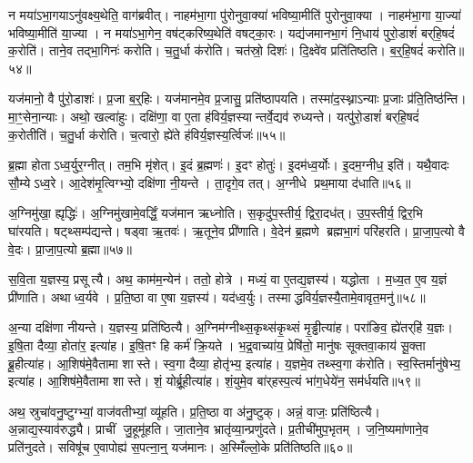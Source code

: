 न मया॑\-ऽभा॒गया\-ऽनु॑वक्ष्य॒थेति॒ वाग॑ब्रवीत्।
नाहम॑भा॒गा पु॑रोनुवा॒क्या॑ भविष्या॒मीति॑ पुरोनुवा॒क्या।
नाहम॑भा॒गा या॒ज्या॑ भविष्या॒मीति॑ या॒ज्या।
न मया॑\-ऽभा॒गेन॒ वष॑ट्करिष्य॒थेति॑ वषट्का॒रः।
यद्य॑जमानभा॒गं नि॒धाय॑ पुरो॒डाशं॑ बर्‌\mbox{}हि॒षदं॑ क॒रोति॑।
ताने॒व तद्भा॒गिनः॑ करोति।
च॒तु॒र्धा क॑रोति।
चत॑स्रो॒ दिशः॑।
दि॒क्ष्वे॑व प्रति॑तिष्ठति।
ब॒र्॒हि॒षदं॑ करोति॥५४॥

यज॑मानो॒ वै पु॑रो॒डाशः॑।
प्र॒जा ब॒र्॒हिः।
यज॑मानमे॒व प्र॒जासु॒ प्रति॑ष्ठापयति।
तस्मा॑द॒स्थ्ना\-ऽन्याः प्र॒जाः प्र॑ति॒तिष्ठ॑न्ति।
मा॒ꣳ॒सेना॒न्याः।
अथो॒ खल्वा॑हुः।
दक्षि॑णा॒ वा ए॒ता ह॑विर्य॒ज्ञस्यान्तर्वे॒द्यव॑ रुध्यन्ते।
यत्पु॑रो॒डाशं॑ बर्‌\mbox{}हि॒षदं॑ क॒रोतीति॑।
च॒तु॒र्धा क॑रोति।
च॒त्वारो॒ ह्ये॑ते ह॑विर्य॒ज्ञस्य॒र्त्विजः॑॥५५॥

ब्र॒ह्मा होता\-ऽध्व॒र्युर॒ग्नीत्।
तम॒भि मृ॑शेत्।
इ॒दं ब्र॒ह्मणः॑।
इ॒दꣳ होतुः॑।
इ॒दम॑ध्व॒र्योः।
इ॒दम॒ग्नीध॒ इति॑।
यथै॒वादः सौ॒म्ये\-ऽध्व॒रे।
आ॒देश॑मृ॒त्विग्भ्यो॒ दक्षि॑णा नी॒यन्ते।
ता॒दृगे॒व तत्।
अ॒ग्नीधे प्रथ॒माया द॑धाति॥५६॥

अ॒ग्निमु॑खा॒ ह्यृद्धिः॑।
अ॒ग्निमु॑खामे॒वर्द्धिं॒ यज॑मान ऋध्नोति।
स॒कृदु॑प॒स्तीर्य॒ द्विरा॒दध॑त्।
उ॒प॒स्तीर्य॒ द्विर॒भि घा॑रयति।
षट्थ्सम्प॑द्यन्ते।
षड्वा ऋ॒तवः॑।
ऋ॒तूने॒व प्री॑णाति।
वे॒देन॑ ब्र॒ह्मणे ब्रह्मभा॒गं परि॑हरति।
प्रा॒जा॒प॒त्यो वै वे॒दः।
प्रा॒जा॒प॒त्यो ब्र॒ह्मा॥५७॥

स॒वि॒ता य॒ज्ञस्य॒ प्रसूत्यै।
अथ॒ काम॑म॒न्येन॑।
ततो॒ होत्रे।
मध्यं॒ वा ए॒तद्य॒ज्ञस्य॑।
यद्धोता।
म॒ध्य॒त ए॒व य॒ज्ञं प्री॑णाति।
अथाध्व॒र्यवे।
प्र॒ति॒ष्ठा वा ए॒षा य॒ज्ञस्य॑।
यद॑ध्व॒र्युः।
तस्माद्धविर्य॒ज्ञस्यै॒तामे॒वावृत॒मनु॑॥५८॥

अ॒न्या दक्षि॑णा नीयन्ते।
य॒ज्ञस्य॒ प्रति॑ष्ठित्यै।
अ॒ग्निम॑ग्नीथ्स॒कृथ्स॑कृ॒थ्सं मृ॒ड्ढीत्या॑ह।
परा॑ङिव॒ ह्ये॑तर्‌\mbox{}हि॑ य॒ज्ञः।
इ॒षि॒ता दैव्या॒ होता॑र॒ इत्या॑ह।
इ॒षि॒तꣳ हि कर्म॑ क्रि॒यते।
भ॒द्र॒वाच्या॑य॒ प्रेषि॑तो॒ मानु॑षः सूक्तवा॒काय॑ सू॒क्ता ब्रू॒हीत्या॑ह।
आ॒शिष॑मे॒वैतामा शास्ते।
स्व॒गा दैव्या॒ होतृ॑भ्य॒ इत्या॑ह।
य॒ज्ञमे॒व तथ्स्व॒गा क॑रोति।
स्व॒स्तिर्मानु॑षेभ्य॒ इत्या॑ह।
आ॒शिष॑मे॒वैतामा शास्ते।
शं॒ योर्ब्रू॒हीत्या॑ह।
शं॒युमे॒व बा॑र्‌\mbox{}हस्प॒त्यं भा॑ग॒धेये॑न॒ सम॑र्धयति॥५९॥

अथ॒ स्रुचा॑वनु॒ष्टुग्भ्यां॒ वाज॑वतीभ्यां॒ व्यू॑हति।
प्र॒ति॒ष्ठा वा अ॑नु॒ष्टुक्।
अन्नं॒ वाजः॒ प्रति॑ष्ठित्यै।
अ॒न्नाद्य॒स्याव॑रुद्ध्यै।
प्राचीं जु॒हूमू॑हति।
जा॒ताने॒व भ्रातृ॑व्या॒न्प्रणु॑दते।
प्र॒तीची॑मुप॒भृतम्।
ज॒नि॒ष्यमा॑णाने॒व प्रति॑नुदते।
सविषू॑च ए॒वापोह्य॑ स॒पत्ना॒न्॒ यज॑मानः।
अ॒स्मिँल्लो॒के प्रति॑तिष्ठति॥६०॥

